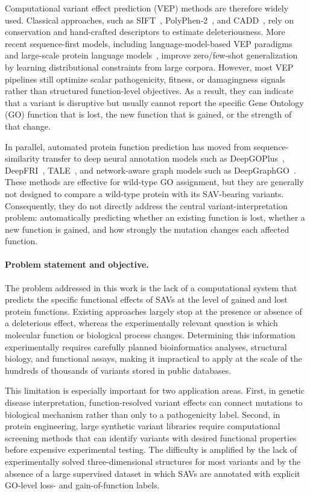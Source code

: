 \documentclass[11pt,a4paper]{article}
\begin{document}
Computational variant effect prediction (VEP) methods are therefore widely used. Classical approaches, such as SIFT~\cite{ng2001predicting}, PolyPhen-2~\cite{adzhubei2010method}, and CADD~\cite{kircher2014general}, rely on conservation and hand-crafted descriptors to estimate deleteriousness. More recent sequence-first models, including language-model-based VEP paradigms~\cite{meier2021language} and large-scale protein language models~\cite{lin2023evolutionary}, improve zero/few-shot generalization by learning distributional constraints from large corpora. However, most VEP pipelines still optimize scalar pathogenicity, fitness, or damagingness signals rather than structured function-level objectives. As a result, they can indicate that a variant is disruptive but usually cannot report the specific Gene Ontology (GO) function that is lost, the new function that is gained, or the strength of that change.

In parallel, automated protein function prediction has moved from sequence-similarity transfer to deep neural annotation models such as DeepGOPlus~\cite{kulmanov2019deepgoplus}, DeepFRI~\cite{gligorijevic2021structure}, TALE~\cite{cao2021tale}, and network-aware graph models such as DeepGraphGO~\cite{zhang2021deepgraphgo}. These methods are effective for wild-type GO assignment, but they are generally not designed to compare a wild-type protein with its SAV-bearing variants. Consequently, they do not directly address the central variant-interpretation problem: automatically predicting whether an existing function is lost, whether a new function is gained, and how strongly the mutation changes each affected function.

\paragraph{Problem statement and objective.}
The problem addressed in this work is the lack of a computational system that predicts the specific functional effects of SAVs at the level of gained and lost protein functions. Existing approaches largely stop at the presence or absence of a deleterious effect, whereas the experimentally relevant question is which molecular function or biological process changes. Determining this information experimentally requires carefully planned bioinformatics analyses, structural biology, and functional assays, making it impractical to apply at the scale of the hundreds of thousands of variants stored in public databases.

This limitation is especially important for two application areas. First, in genetic disease interpretation, function-resolved variant effects can connect mutations to biological mechanism rather than only to a pathogenicity label. Second, in protein engineering, large synthetic variant libraries require computational screening methods that can identify variants with desired functional properties before expensive experimental testing. The difficulty is amplified by the lack of experimentally solved three-dimensional structures for most variants and by the absence of a large supervised dataset in which SAVs are annotated with explicit GO-level loss- and gain-of-function labels.
\end{document}
